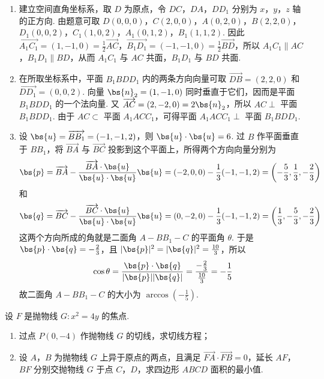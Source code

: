 \begin{solution}
\begin{enumerate}
\item 建立空间直角坐标系，取 \(D\) 为原点，令 \(DC\)，\(DA\)，\(DD_{1}\) 分别为 \(x\)，\(y\)，\(z\) 轴的正方向. 由题意可取
\(D(0,0,0)\)，\(C(2,0,0)\)，\(A(0,2,0)\)，\(B(2,2,0)\)，\(D_{1}(0,0,2)\)，\(C_{1}(1,0,2)\)，\(A_{1}(0,1,2)\)，\(B_{1}(1,1,2)\). 因此 \(\overrightarrow{A_{1}C_{1}}=(1,-1,0)=\frac12\overrightarrow{AC}\)，\(\overrightarrow{B_{1}D_{1}}=(-1,-1,0)=\frac12\overrightarrow{BD}\)，所以 \(A_{1}C_{1}\parallel AC\)，\(B_{1}D_{1}\parallel BD\)，从而 \(A_{1}C_{1}\) 与 \(AC\) 共面，\(B_{1}D_{1}\) 与 \(BD\) 共面.
\item 在所取坐标系中，平面 \(B_{1}BDD_{1}\) 内的两条方向向量可取
\(\overrightarrow{DB}=(2,2,0)\) 和 \(\overrightarrow{DD_{1}}=(0,0,2)\). 向量
\(\bs{n}_{2}=(1,-1,0)\) 同时垂直于它们，因而是平面 \(B_{1}BDD_{1}\) 的一个法向量.
又 \(\overrightarrow{AC}=(2,-2,0)=2\bs{n}_{2}\)，所以 \(AC\perp\) 平面
\(B_{1}BDD_{1}\). 由于 \(AC\subset\) 平面 \(A_{1}ACC_{1}\)，可得平面
\(A_{1}ACC_{1}\perp\) 平面 \(B_{1}BDD_{1}\).
\item 设 \(\bs{u}=\overrightarrow{BB_{1}}=(-1,-1,2)\)，则 \(\bs{u}\cdot\bs{u}=6\). 过 \(B\) 作平面垂直于 \(BB_{1}\)，将 \(\overrightarrow{BA}\) 与 \(\overrightarrow{BC}\) 投影到这个平面上，所得两个方向向量分别为
\[
\bs{p}=\overrightarrow{BA}-\frac{\overrightarrow{BA}\cdot\bs{u}}{\bs{u}\cdot\bs{u}}\bs{u}
=(-2,0,0)-\frac13(-1,-1,2)
=\left(-\frac53,\frac13,-\frac23\right)
\]
和
\[
\bs{q}=\overrightarrow{BC}-\frac{\overrightarrow{BC}\cdot\bs{u}}{\bs{u}\cdot\bs{u}}\bs{u}
=(0,-2,0)-\frac13(-1,-1,2)
=\left(\frac13,-\frac53,-\frac23\right)
\]
这两个方向所成的角就是二面角 \(A-BB_{1}-C\) 的平面角 \(\theta\). 于是 \(\bs{p}\cdot\bs{q}=-\frac23\)，且 \(|\bs{p}|^{2}=|\bs{q}|^{2}=\frac{10}{3}\)，所以
\[
\cos\theta=\frac{\bs{p}\cdot\bs{q}}{|\bs{p}||\bs{q}|}
=\frac{-\frac23}{\frac{10}{3}}=-\frac15
\]
故二面角 \(A-BB_{1}-C\) 的大小为 \(\arccos\left(-\frac15\right)\).
\end{enumerate}
\end{solution}

\begin{problem}
设 \(F\) 是抛物线 \(G: x^{2} = 4y\) 的焦点.

\begin{enumerate}
\item 过点 \( P(0, -4) \) 作抛物线 \(G\) 的切线，求切线方程；
\item 设 \(A\)，\(B\) 为抛物线 \(G\) 上异于原点的两点，且满足 \( \overrightarrow{FA} \cdot \overrightarrow{FB} = 0 \)，延长 \(AF\)，\(BF\) 分别交抛物线 \(G\) 于点 \(C\)，\(D\)，求四边形 \(ABCD\) 面积的最小值.
\end{enumerate}
\end{problem}

